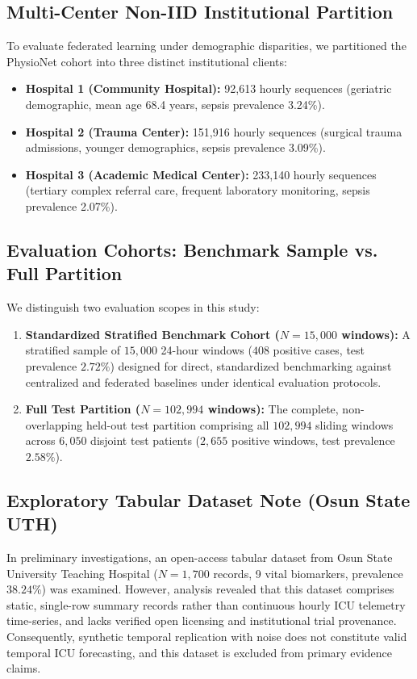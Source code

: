 \documentclass[10pt,a4paper,twocolumn,twoside]{article}
\begin{document}
\subsection{Multi-Center Non-IID Institutional Partition}
To evaluate federated learning under demographic disparities, we partitioned the PhysioNet cohort into three distinct institutional clients:
\begin{itemize}
    \item \textbf{Hospital 1 (Community Hospital):} 92,613 hourly sequences (geriatric demographic, mean age 68.4 years, sepsis prevalence 3.24\%).
    \item \textbf{Hospital 2 (Trauma Center):} 151,916 hourly sequences (surgical trauma admissions, younger demographics, sepsis prevalence 3.09\%).
    \item \textbf{Hospital 3 (Academic Medical Center):} 233,140 hourly sequences (tertiary complex referral care, frequent laboratory monitoring, sepsis prevalence 2.07\%).
\end{itemize}

\subsection{Evaluation Cohorts: Benchmark Sample vs. Full Partition}
We distinguish two evaluation scopes in this study:
\begin{enumerate}
    \item \textbf{Standardized Stratified Benchmark Cohort ($N=15,000$ windows):} A stratified sample of $15,000$ 24-hour windows ($408$ positive cases, test prevalence $2.72\%$) designed for direct, standardized benchmarking against centralized and federated baselines under identical evaluation protocols.
    \item \textbf{Full Test Partition ($N=102,994$ windows):} The complete, non-overlapping held-out test partition comprising all $102,994$ sliding windows across $6,050$ disjoint test patients ($2,655$ positive windows, test prevalence $2.58\%$).
\end{enumerate}

\subsection{Exploratory Tabular Dataset Note (Osun State UTH)}
In preliminary investigations, an open-access tabular dataset from Osun State University Teaching Hospital ($N=1,700$ records, 9 vital biomarkers, prevalence $38.24\%$) was examined. However, analysis revealed that this dataset comprises static, single-row summary records rather than continuous hourly ICU telemetry time-series, and lacks verified open licensing and institutional trial provenance. Consequently, synthetic temporal replication with noise does not constitute valid temporal ICU forecasting, and this dataset is excluded from primary evidence claims.
\end{document}
